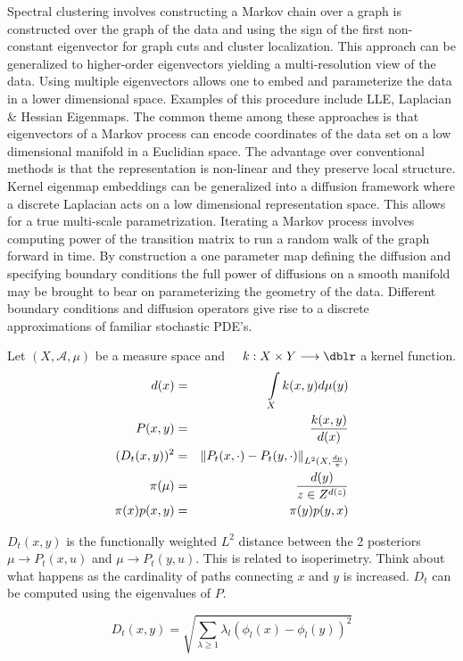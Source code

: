 Spectral clustering involves constructing a Markov chain over a graph is constructed over the graph of the data and using the sign of the first non-constant eigenvector for graph cuts and cluster localization.  This approach can be generalized to higher-order eigenvectors yielding a multi-resolution view of the data. Using multiple eigenvectors allows one to embed and parameterize the data in a lower dimensional space.  Examples of this procedure include LLE, Laplacian \& Hessian Eigenmaps.  The common theme among these approaches is that eigenvectors of a Markov process can encode coordinates of the data set on a low dimensional manifold in a Euclidian space.  The advantage over conventional methods is that the representation is non-linear and they preserve local structure. Kernel eigenmap embeddings can be generalized into a diffusion  framework where a discrete Laplacian acts on a low dimensional representation space.  This allows for a true multi-scale parametrization.  Iterating a Markov process involves computing power of the transition matrix to run a random walk of the graph forward in time.   By construction a one parameter map defining the diffusion and specifying boundary conditions the full power of diffusions on a smooth manifold may be brought to bear on parameterizing the geometry of the data.  Different boundary conditions and diffusion operators give rise to a discrete approximations of familiar stochastic PDE's.

Let $(X,\mathcal{A},\mu)$ be a measure space and $\quad k: X \times Y \longrightarrow \dblr $ a kernel function.
 \begin{eqnarray}
 d(x) &=& \int\limits_{X} k(x,y) d \mu(y)  \\
 P(x,y) &=& \frac{ k(x,y) }{ d(x) }    \\
 (D_t (x,y))^2 &=& \left\Vert P_t(x, \cdot) - P_t(y,\cdot )\right\Vert_{ L^2(X,\frac{d\mu}{\pi}) }  \\
 \pi(\mu) &=&  \frac{d(y)}{z \in Z^{d(z)} } \\
 \pi(x) p(x,y) &=& \pi(y) p(y,x)
 \end{eqnarray}


$D_t (x,y)$ is the functionally weighted $L^2$ distance between the 2 posteriors $\mu \rightarrow P_t(x,u) $ and $\mu \rightarrow P_t(y,u) $.  This is related to isoperimetry. Think about what happens as the cardinality of paths connecting $x$ and $y$ is increased.  $D_t$ can be computed using the eigenvalues of $P$.

\begin{equation}
D_t (x,y) = \sqrt{ \sum\limits_{\lambda \geq 1 }{} \lambda_{l} ( \phi_l (x) - \phi_l (y) )^2   }
\end{equation}

